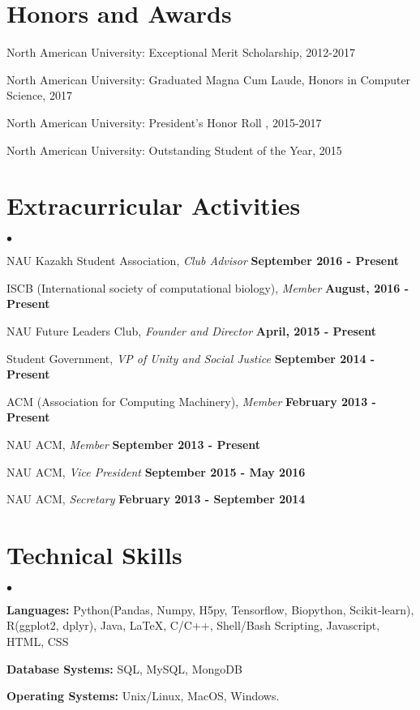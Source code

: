 \documentclass[margin,line]{res}
\newenvironment{list2}{
  \begin{list}{$\bullet$}{%
      \setlength{\itemsep}{0in}
      \setlength{\parsep}{0in} \setlength{\parskip}{0in}
      \setlength{\topsep}{0in} \setlength{\partopsep}{0in} 
      \setlength{\leftmargin}{0.2in}}}{\end{list}}
\begin{document}
\begin{resume}
\section{\sc Honors and Awards} 

North American University: Exceptional Merit Scholarship, 2012-2017

\vspace*{-2.5mm}
North American University: Graduated Magna Cum Laude, Honors in Computer Science, 2017

\vspace*{-2.5mm}
North American University: President's Honor Roll , 2015-2017

\vspace*{-2.5mm}
North American University: Outstanding Student of the Year, 2015


\section{\sc Extracurricular Activities}
\begin{list2}
\item NAU Kazakh Student Association, {\em Club Advisor} \hfill {\bf September 2016 - Present} 
\item ISCB (International society of computational biology), {\em Member} \hfill {\bf August, 2016 - Present}
\item NAU Future Leaders Club, {\em Founder and Director} \hfill {\bf April, 2015 - Present}
\item Student Government, {\em VP of Unity and Social Justice} \hfill  {\bf September 2014 - Present}
\item ACM (Association for Computing Machinery), {\em Member} \hfill  {\bf February 2013 - Present}
\item NAU ACM, {\em Member} \hfill {\bf September 2013 - Present}
\item NAU ACM, {\em Vice President} \hfill  {\bf September 2015 - May 2016}
\item NAU ACM, {\em Secretary} \hfill  {\bf February 2013 - September 2014}
\end{list2}

\section{\sc Technical Skills} 
\begin{list2}
\item {\bf Languages:}  Python(Pandas, Numpy, H5py, Tensorflow, Biopython, Scikit-learn), R(ggplot2, dplyr), Java, \LaTeX, C/C++, Shell/Bash Scripting, Javascript, HTML, CSS
\item {\bf Database Systems:} SQL, MySQL, MongoDB
\item {\bf Operating Systems:}  Unix/Linux, MacOS, Windows.
\end{list2}


\end{resume}
\end{document}
